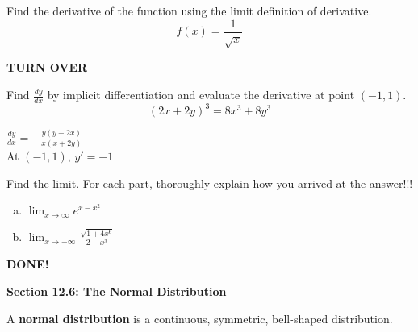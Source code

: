 \documentclass[12pt]{gWmaths}
\begin{document}
\begin{Exercise}
Find the derivative of the function using the limit definition of derivative. $$f(x) = \frac{1}{\sqrt{x}}$$
\vspace{8 in}
\end{Exercise}

\centerline{\bf TURN OVER}
\vfill\eject


\begin{Exercise}
Find $\frac{dy}{dx}$ by implicit differentiation and evaluate the derivative at point $(-1, 1)$.
$$(2x + 2y)^3 = 8x^3 + 8y^3$$
\vspace{0.3 in}

$\frac{dy}{dx} = -\frac{y(y + 2x)}{x (x + 2y)}$ \\

At $(-1, 1)$, $y' = -1$
\end{Exercise}

\vspace{0.3 in}


\begin{Exercise}
Find the limit. For each part, thoroughly explain how you arrived at the answer!!! 
\begin{enumerate}[a)]
\item  $\lim_{x \to \infty} e^{x - x^2}$
\vspace{4 in}
\item  $\lim_{x \to -\infty} \frac{\sqrt{1 + 4x^6}}{2 - x^3}$
\vspace{4 in}
\end{enumerate}
\end{Exercise}

\centerline{\bf DONE!}
\vfill\eject




\noindent
\textbf{Section 12.6: The Normal Distribution}\\


\begin{Def}
A \textbf{normal distribution} is a continuous, symmetric, bell-shaped distribution. \\
\end{Def}


\noindent
\textbf{}
\end{document}
